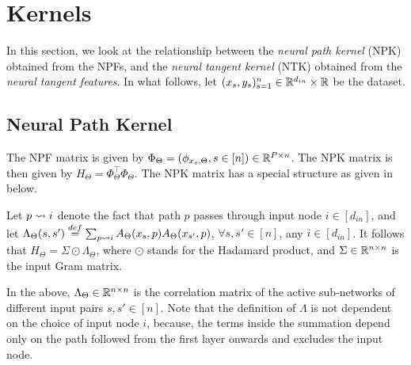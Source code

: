 \section{Kernels}\label{sec:kernels}
In this section, we look at the relationship between the \emph{neural path kernel} (NPK) obtained from the NPFs, and the \emph{neural tangent kernel} (NTK) obtained from the \emph{neural tangent features}. In what follows, let $(x_s,y_s)_{s=1}^n\in\mathbb{R}^{d_{in}}\times\mathbb{R}$ be the dataset. 
\subsection{Neural Path Kernel}
The NPF matrix is given by $\Phi_{\Theta}=(\phi_{x_s,\Theta},s\in[n])\in\mathbb{R}^{P\times n}$. The NPK matrix is then given by $H_{\Theta}=\Phi^\top_{\Theta}\Phi_{\Theta}$. The NPK matrix has a special structure as given in  below.
\begin{lemma}\label{lm:npk}
Let $p\rightsquigarrow i$ denote the fact that path $p$ passes through input node $i\in[d_{in}]$, and let $\Lambda_{\Theta}(s,s')\stackrel{def}{=}\sum_{p\rightsquigarrow i} A_{\Theta}(x_s,p) A_{\Theta}(x_{s'},p)$, $\forall s,s'\in[n]$, any $i\in [d_{in}]$. It follows that $H_{\Theta}= \Sigma\odot\Lambda_{\Theta}$, where $\odot$ stands for the Hadamard product, and $\Sigma \in \mathbb{R}^{n\times n}$ is the input Gram matrix.
\end{lemma}
In the  above, $\Lambda_{\Theta}\in\mathbb{R}^{n\times n}$ is the correlation matrix of the active sub-networks of different input pairs $s,s'\in[n]$. Note that the definition of $\Lambda$ is not dependent on the choice of input node $i$, because, the terms inside the summation depend only on the path followed from the first layer onwards and excludes the input node.

